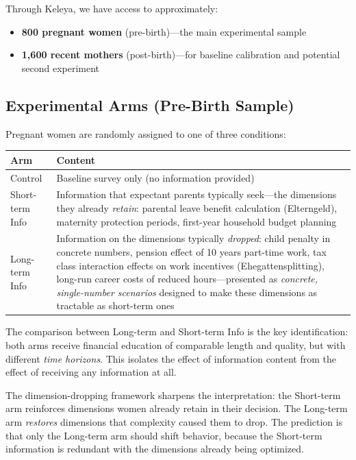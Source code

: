 \documentclass[12pt,a4paper]{article}
\begin{document}
Through Keleya, we have access to approximately:
\begin{itemize}[nosep]
    \item \textbf{800 pregnant women} (pre-birth)---the main experimental sample
    \item \textbf{1{,}600 recent mothers} (post-birth)---for baseline calibration and potential second experiment
\end{itemize}

\subsection{Experimental Arms (Pre-Birth Sample)}

Pregnant women are randomly assigned to one of three conditions:

\begin{table}[h]
\centering
\begin{tabular}{@{}lp{10cm}@{}}
\toprule
\textbf{Arm} & \textbf{Content} \\
\midrule
Control & Baseline survey only (no information provided) \\[0.5em]
Short-term Info & Information that expectant parents typically seek---the dimensions they already \emph{retain}: parental leave benefit calculation (Elterngeld), maternity protection periods, first-year household budget planning \\[0.5em]
Long-term Info & Information on the dimensions typically \emph{dropped}: child penalty in concrete numbers, pension effect of 10 years part-time work, tax class interaction effects on work incentives (Ehegattensplitting), long-run career costs of reduced hours---presented as \emph{concrete, single-number scenarios} designed to make these dimensions as tractable as short-term ones \\
\bottomrule
\end{tabular}
\end{table}

The comparison between Long-term and Short-term Info is the key identification: both arms receive financial education of comparable length and quality, but with different \emph{time horizons}. This isolates the effect of information content from the effect of receiving any information at all.

The dimension-dropping framework sharpens the interpretation: the Short-term arm reinforces dimensions women already retain in their decision. The Long-term arm \emph{restores} dimensions that complexity caused them to drop. The prediction is that only the Long-term arm should shift behavior, because the Short-term information is redundant with the dimensions already being optimized.
\end{document}
